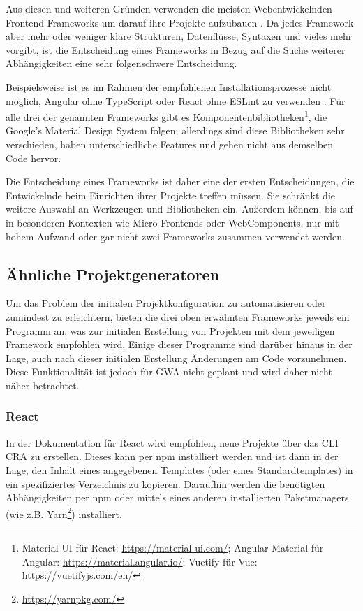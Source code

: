 Aus diesen und weiteren Gründen verwenden die meisten Webentwickelnden Frontend-Frameworks um darauf ihre Projekte aufzubauen \cite{stateofjs}. Da jedes Framework aber mehr oder weniger klare Strukturen, Datenflüsse, Syntaxen und vieles mehr vorgibt, ist die Entscheidung eines Frameworks in Bezug auf die Suche weiterer Abhängigkeiten eine sehr folgenschwere Entscheidung.

Beispielsweise ist es im Rahmen der empfohlenen Installationsprozesse nicht möglich, Angular ohne TypeScript oder React ohne ESLint zu verwenden \cite{angular_only_with_typescript} \cite{react_eslint}. Für alle drei der genannten Frameworks gibt es Komponentenbibliotheken\footnote{Material-UI für React: \url{https://material-ui.com/}; Angular Material für Angular: \url{https://material.angular.io/}; Vuetify für Vue: \url{https://vuetifyjs.com/en/}}, die Google's Material Design System folgen; allerdings sind diese Bibliotheken sehr verschieden, haben unterschiedliche Features und gehen nicht aus demselben Code hervor.

Die Entscheidung eines Frameworks ist daher eine der ersten Entscheidungen, die Entwickelnde beim Einrichten ihrer Projekte treffen müssen. Sie schränkt die weitere Auswahl an Werkzeugen und Bibliotheken ein. Außerdem können, bis auf in besonderen Kontexten wie Micro-Frontends oder WebComponents, nur mit hohem Aufwand oder gar nicht zwei Frameworks zusammen verwendet werden.

\subsection{Ähnliche Projektgeneratoren}
Um das Problem der initialen Projektkonfiguration zu automatisieren oder zumindest zu erleichtern, bieten die drei oben erwähnten Frameworks jeweils ein Programm an, was zur initialen Erstellung von Projekten mit dem jeweiligen Framework empfohlen wird. Einige dieser Programme sind darüber hinaus in der Lage, auch nach dieser initialen Erstellung Änderungen am Code vorzunehmen. Diese Funktionalität ist jedoch für \gls{GWA} nicht geplant und wird daher nicht näher betrachtet.

\subsubsection{React}
In der Dokumentation für React wird empfohlen, neue Projekte über das \gls{CLI} \gls{CRA} zu erstellen. Dieses kann per \gls{npm} installiert werden und ist dann in der Lage, den Inhalt eines angegebenen Templates (oder eines Standardtemplates) in ein spezifiziertes Verzeichnis zu kopieren. Daraufhin werden die benötigten Abhängigkeiten per \gls{npm} oder mittels eines anderen installierten Paketmanagers (wie z.B. Yarn\footnote{\url{https://yarnpkg.com/}}) installiert.

